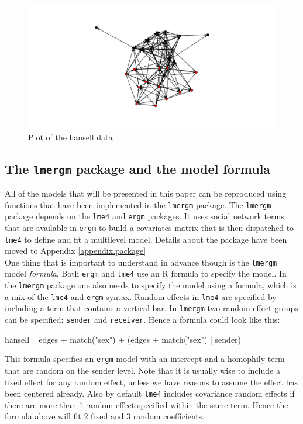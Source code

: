 \documentclass[a4paper]{article}
\begin{document}
\begin{figure}[h!]
\centering
\includegraphics{paper-hansellplot}
\caption{Plot of the hansell data}
\label{fig:hansellplot}
\end{figure}


\subsection{The \texttt{lmergm} package and the model formula}

All of the models that will be presented in this paper can be reproduced using functions that have 
been implemented in the \texttt{lmergm} package. The \texttt{lmergm} package depends on the \texttt{lme4} \citep{bates2007lme4} and \texttt{ergm} \citep{hunter2008ergm} packages.
It uses social network terms that are available in \texttt{ergm} to build a covariates matrix that is then
dispatched to \texttt{lme4} to define and fit a multilevel model. 
Details about the package have been moved to Appendix \ref{appendix.package}\\

One thing that is important to understand in advance though is the \texttt{lmergm} model \emph{formula}. Both \texttt{ergm} and \texttt{lme4}
use an R formula to specify the model. In the \texttt{lmergm} package one also needs to specify the model using
a formula, which is a mix of the \texttt{lme4} and \texttt{ergm} syntax. Random effects in \texttt{lme4} are specified by including
a term that contains a vertical bar. In \texttt{lmergm} two random effect groups can be specified: \texttt{sender} and \texttt{receiver}.
Hence a formula could look like this:
\begin{Schunk}
\begin{Soutput}
hansell ~ edges + match("sex") + (edges + match("sex") | sender)
\end{Soutput}
\end{Schunk}
This formula specifies an \texttt{ergm} model with an intercept and a homophily term that are random on the sender level. 
Note that it is usually wise to include a fixed effect for any random effect, unless we have reasons to assume the effect has been centered already.
Also by default \texttt{lme4} includes covariance random effects if there are more than 1 random effect specified within
the same term. Hence the formula above will fit 2 fixed and 3 random coefficients. 
\end{document}

